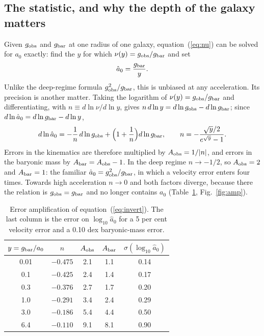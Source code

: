 \documentclass[fleqn,usenatbib]{mnras}
\begin{document}
\subsection{The statistic, and why the depth of the galaxy matters}
\label{sec:amp}
Given $g_{\rm obs}$ and $g_{\rm bar}$ at one radius of one galaxy, equation~(\ref{eq:nu}) can be solved for $a_0$ exactly: find the $y$ for which $\nu(y)=g_{\rm obs}/g_{\rm bar}$ and set
\begin{equation}
\hat a_0=\frac{g_{\rm bar}}{y} .
\label{eq:invert}
\end{equation}
Unlike the deep-regime formula $g_{\rm obs}^2/g_{\rm bar}$, this is unbiased at any acceleration. Its precision is another matter. Taking the logarithm of $\nu(y)=g_{\rm obs}/g_{\rm bar}$ and differentiating, with $n\equiv d\ln\nu/d\ln y$, gives $n\,d\ln y=d\ln g_{\rm obs}-d\ln g_{\rm bar}$; since $d\ln\hat a_0=d\ln g_{\rm bar}-d\ln y$,
\begin{equation}
d\ln\hat a_0=-\frac1n\,d\ln g_{\rm obs}+\Big(1+\frac1n\Big)d\ln g_{\rm bar},\qquad n=-\frac{\sqrt y/2}{e^{\sqrt y}-1} .
\label{eq:amp}
\end{equation}
Errors in the kinematics are therefore multiplied by $A_{\rm obs}=1/|n|$, and errors in the baryonic mass by $A_{\rm bar}=A_{\rm obs}-1$. In the deep regime $n\to-1/2$, so $A_{\rm obs}=2$ and $A_{\rm bar}=1$: the familiar $\hat a_0=g_{\rm obs}^2/g_{\rm bar}$, in which a velocity error enters four times. Towards high acceleration $n\to0$ and both factors diverge, because there the relation is $g_{\rm obs}=g_{\rm bar}$ and no longer contains $a_0$ (Table~\ref{tab:amp}, Fig.~\ref{fig:amp}).

\begin{table}
\caption{Error amplification of equation~(\ref{eq:invert}). The last column is the error on $\log_{10}\hat a_0$ for a 5 per cent velocity error and a 0.10 dex baryonic-mass error.}
\label{tab:amp}
\begin{tabular}{ccccc}
\toprule
$y=g_{\rm bar}/a_0$ & $n$ & $A_{\rm obs}$ & $A_{\rm bar}$ & $\sigma(\log_{10}\hat a_0)$\\
\midrule
0.01 & $-0.475$ & 2.1 & 1.1 & 0.14\\
0.1 & $-0.425$ & 2.4 & 1.4 & 0.17\\
0.3 & $-0.376$ & 2.7 & 1.7 & 0.20\\
1.0 & $-0.291$ & 3.4 & 2.4 & 0.29\\
3.0 & $-0.186$ & 5.4 & 4.4 & 0.50\\
6.4 & $-0.110$ & 9.1 & 8.1 & 0.90\\
\bottomrule
\end{tabular}
\end{table}
\end{document}
